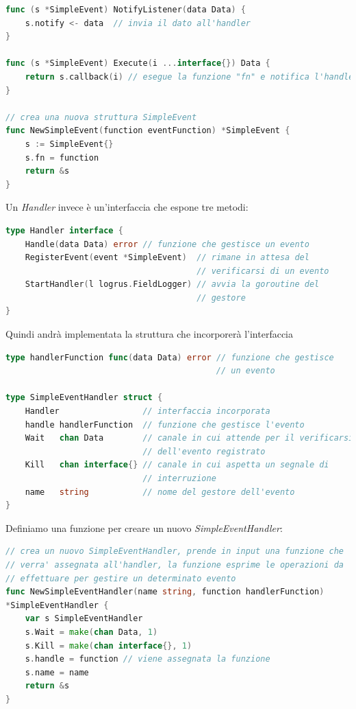 \documentclass[main.tex]{subfiles}
\begin{document}
\begin{lstlisting}[language=go]
func (s *SimpleEvent) NotifyListener(data Data) {
	s.notify <- data  // invia il dato all'handler
}

func (s *SimpleEvent) Execute(i ...interface{}) Data {
	return s.callback(i) // esegue la funzione "fn" e notifica l'handler
}

// crea una nuova struttura SimpleEvent
func NewSimpleEvent(function eventFunction) *SimpleEvent {
    s := SimpleEvent{}
    s.fn = function
    return &s
}

\end{lstlisting}
Un \emph{Handler} invece è un'interfaccia che espone tre metodi:
\begin{lstlisting}[language=go]
type Handler interface {
    Handle(data Data) error // funzione che gestisce un evento
    RegisterEvent(event *SimpleEvent)  // rimane in attesa del 
                                       // verificarsi di un evento
    StartHandler(l logrus.FieldLogger) // avvia la goroutine del
                                       // gestore
}
\end{lstlisting}
Quindi andrà implementata la struttura che incorporerà l'interfaccia
\begin{lstlisting}[language=go]
type handlerFunction func(data Data) error // funzione che gestisce 
                                           // un evento

type SimpleEventHandler struct {
    Handler                 // interfaccia incorporata
    handle handlerFunction  // funzione che gestisce l'evento
    Wait   chan Data        // canale in cui attende per il verificarsi 
                            // dell'evento registrato 
    Kill   chan interface{} // canale in cui aspetta un segnale di 
                            // interruzione
    name   string           // nome del gestore dell'evento
}
\end{lstlisting}
Definiamo una funzione per creare un nuovo \emph{SimpleEventHandler}:
\begin{lstlisting}[language=go]
// crea un nuovo SimpleEventHandler, prende in input una funzione che 
// verra' assegnata all'handler, la funzione esprime le operazioni da 
// effettuare per gestire un determinato evento
func NewSimpleEventHandler(name string, function handlerFunction) 
*SimpleEventHandler {
	var s SimpleEventHandler
	s.Wait = make(chan Data, 1)
	s.Kill = make(chan interface{}, 1)
	s.handle = function // viene assegnata la funzione
	s.name = name
	return &s
}
\end{lstlisting}
\end{document}
